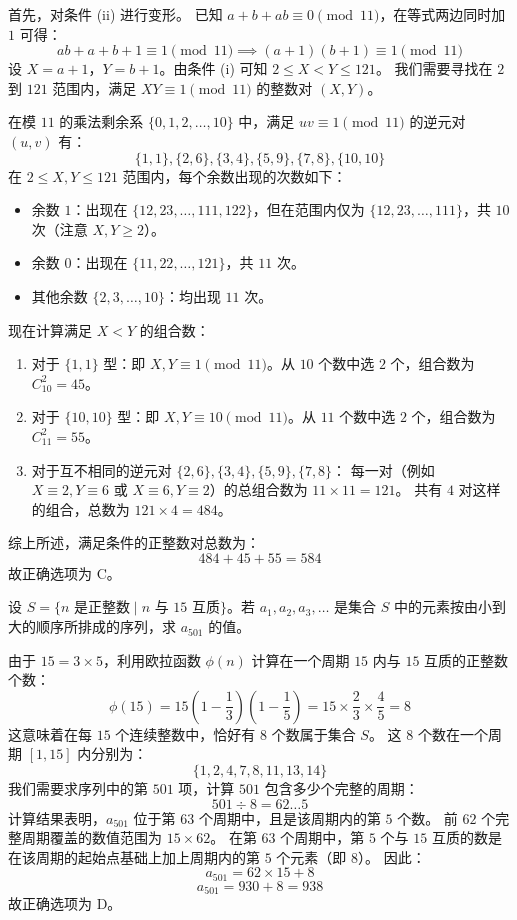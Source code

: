 \begin{questions}
\begin{solution}
首先，对条件 (ii) 进行变形。
已知 $a + b + ab \equiv 0 \pmod{11}$，在等式两边同时加 $1$ 可得：
\[
ab + a + b + 1 \equiv 1 \pmod{11} \implies (a+1)(b+1) \equiv 1 \pmod{11}
\]
设 $X = a+1$，$Y = b+1$。由条件 (i) 可知 $2 \le X < Y \le 121$。
我们需要寻找在 $2$ 到 $121$ 范围内，满足 $XY \equiv 1 \pmod{11}$ 的整数对 $(X, Y)$。

在模 $11$ 的乘法剩余系 $\{0, 1, 2, \dots, 10\}$ 中，满足 $uv \equiv 1 \pmod{11}$ 的逆元对 $(u, v)$ 有：
\[
\{1, 1\}, \{2, 6\}, \{3, 4\}, \{5, 9\}, \{7, 8\}, \{10, 10\}
\]
在 $2 \le X, Y \le 121$ 范围内，每个余数出现的次数如下：
\begin{itemize}
    \item 余数 $1$：出现在 $\{12, 23, \dots, 111, 122\}$，但在范围内仅为 $\{12, 23, \dots, 111\}$，共 $10$ 次（注意 $X, Y \ge 2$）。
    \item 余数 $0$：出现在 $\{11, 22, \dots, 121\}$，共 $11$ 次。
    \item 其他余数 $\{2, 3, \dots, 10\}$：均出现 $11$ 次。
\end{itemize}

现在计算满足 $X < Y$ 的组合数：
\begin{enumerate}
    \item 对于 $\{1, 1\}$ 型：即 $X, Y \equiv 1 \pmod{11}$。从 $10$ 个数中选 $2$ 个，组合数为 $C_{10}^2 = 45$。
    \item 对于 $\{10, 10\}$ 型：即 $X, Y \equiv 10 \pmod{11}$。从 $11$ 个数中选 $2$ 个，组合数为 $C_{11}^2 = 55$。
    \item 对于互不相同的逆元对 $\{2, 6\}, \{3, 4\}, \{5, 9\}, \{7, 8\}$：
    每一对（例如 $X \equiv 2, Y \equiv 6$ 或 $X \equiv 6, Y \equiv 2$）的总组合数为 $11 \times 11 = 121$。
    共有 $4$ 对这样的组合，总数为 $121 \times 4 = 484$。
\end{enumerate}

综上所述，满足条件的正整数对总数为：
\[
484 + 45 + 55 = 584
\]
故正确选项为 C。
\end{solution}

\question 设 $S = \{n \text{ 是正整数} \mid n \text{ 与 } 15 \text{ 互质}\}$。若 $a_1, a_2, a_3, \dots$ 是集合 $S$ 中的元素按由小到大的顺序所排成的序列，求 $a_{501}$ 的值。

\begin{solution}
由于 $15 = 3 \times 5$，利用欧拉函数 $\phi(n)$ 计算在一个周期 $15$ 内与 $15$ 互质的正整数个数：
\[
\phi(15) = 15 \left(1 - \frac{1}{3}\right)\left(1 - \frac{1}{5}\right) = 15 \times \frac{2}{3} \times \frac{4}{5} = 8
\]
这意味着在每 $15$ 个连续整数中，恰好有 $8$ 个数属于集合 $S$。
这 $8$ 个数在一个周期 $[1, 15]$ 内分别为：
\[
\{1, 2, 4, 7, 8, 11, 13, 14\}
\]
我们需要求序列中的第 $501$ 项，计算 $501$ 包含多少个完整的周期：
\[
501 \div 8 = 62 \dots 5
\]
计算结果表明，$a_{501}$ 位于第 $63$ 个周期中，且是该周期内的第 $5$ 个数。
前 $62$ 个完整周期覆盖的数值范围为 $15 \times 62$。
在第 $63$ 个周期中，第 $5$ 个与 $15$ 互质的数是在该周期的起始点基础上加上周期内的第 $5$ 个元素（即 $8$）。
因此：
\[
a_{501} = 62 \times 15 + 8
\]
\[
a_{501} = 930 + 8 = 938
\]
故正确选项为 D。
\end{solution}


\end{questions}
